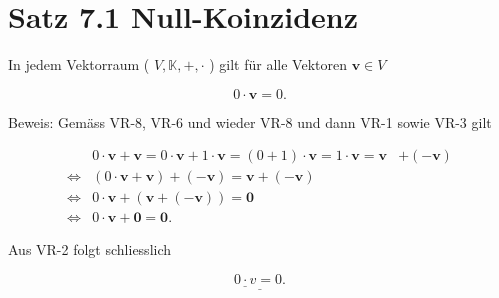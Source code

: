 \documentclass[10pt]{article}
\begin{document}
\section*{Satz 7.1 Null-Koinzidenz}
In jedem Vektorraum ( $V, \mathbb{K},+, \cdot$ ) gilt für alle Vektoren $\mathbf{v} \in V$


\begin{equation*}
0 \cdot \mathbf{v}=0 . \tag{7.2}
\end{equation*}


Beweis: Gemäss VR-8, VR-6 und wieder VR-8 und dann VR-1 sowie VR-3 gilt

\[
\begin{array}{rlrl} 
& 0 \cdot \mathbf{v}+\mathbf{v}=0 \cdot \mathbf{v}+1 \cdot \mathbf{v}=(0+1) \cdot \mathbf{v}=1 \cdot \mathbf{v}=\mathbf{v} & +(-\mathbf{v}) \\
\Leftrightarrow & (0 \cdot \mathbf{v}+\mathbf{v})+(-\mathbf{v})=\mathbf{v}+(-\mathbf{v}) \\
\Leftrightarrow & 0 \cdot \mathbf{v}+(\mathbf{v}+(-\mathbf{v}))=\mathbf{0} \\
\Leftrightarrow & 0 \cdot \mathbf{v}+\mathbf{0}=\mathbf{0} . \tag{7.6}
\end{array}
\]

Aus VR-2 folgt schliesslich


\begin{equation*}
\underline{\underline{0 \cdot v}=0 .} \tag{7.7}
\end{equation*}
\end{document}
